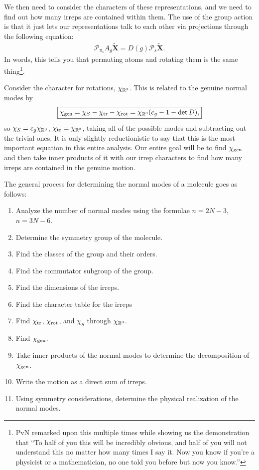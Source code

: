 \documentclass[11pt]{article}
\begin{document}
We then need to consider the characters of these representations,
and we need to find out how many irreps are contained within them.
The use of the group action is that it just lets our representations 
talk to each other via projections through the following equation:
\begin{align*}
    \boxed{\mathcal{P}_{\pi_s} A_g \widetilde{\mathbf{X}} = D(g) \mathcal{P}_s \widetilde{\mathbf{X}}.}
\end{align*}
In words, this tells you that permuting atoms and rotating them
is the same thing\footnote{PvN remarked upon this multiple times
while showing us the demonstration that ``To half of you this will
be incredibly obvious, and half of you will not understand
this no matter how many times I say it. Now you know if you're
a physicist or a mathematician, no one told you before but now you know.''
}.

Consider the character for rotations, $\chi_{\mathbb{R}^3}$. This is related
to the genuine normal modes by
\begin{align*}
    \boxed{\chi_{\rm gen} = \chi_S - \chi_{\rm tr} - \chi_{\rm rot} = \chi_{\mathbb{R}^3} (c_g - 1 - \operatorname{det}{D}),}
\end{align*}
so $\chi_S = c_g \chi_{\mathbb{R}^3}$, $\chi_{\rm tr} = \chi_{\mathbb{R}^3}$,
taking all of the possible modes and subtracting out the trivial ones.
It is only slightly reductionistic to say that this is the most important equation
in this entire analysis. Our entire goal will be to find $\chi_{\rm gen}$
and then take inner products of it with our irrep characters to find how 
many irreps are contained in the genuine motion.


The general process for determining the normal modes of a molecule
goes as follows:
\begin{enumerate}
    \item Analyze the number of normal modes using the formulae
    $n = 2N - 3$, $n = 3N - 6$.
    \item Determine the symmetry group of the molecule.
    \item Find the classes of the group and their orders.
    \item Find the commutator subgroup of the group.
    \item Find the dimensions of the irreps.
    \item Find the character table for the irreps
    \item Find $\chi_{\rm tr}$, $\chi_{\rm rot}$, and $\chi_S$
    through $\chi_{\mathbb{R}^3}$.
    \item Find $\chi_{\rm gen}$.
    \item Take inner products of the normal modes to determine
    the decomposition of $\chi_{\rm gen}$.
    \item Write the motion as a direct sum of irreps.
    \item Using symmetry considerations, determine the
    physical realization of the normal modes.
\end{enumerate}
\end{document}
